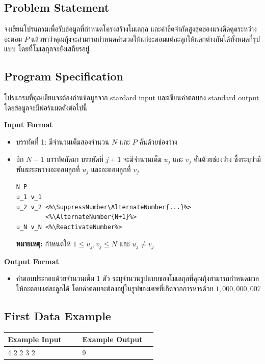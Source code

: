 \subsection*{\sectionfont\upshape Problem Statement}

จงเขียนโปรแกรมเพื่อรับข้อมูลที่กำหนดโครงสร้างโมเลกุล และค่าขีดจำกัดสูงสุดของแรงดึดดูดระหว่างอะตอม $P$ 
แล้วหาว่าคุณกุ้งจะสามารถกำหนดค่ามวลให้แก่อะตอมแต่ละลูกให้แตกต่างกันได้ทั้งหมดกี่รูปแบบ โดยที่โมเลกุลจะยังเสถียรอยู่

\subsection*{\sectionfont\upshape Program Specification}

โปรแกรมที่คุณเขียนจะต้องอ่านข้อมูลจาก stardard input 
และเขียนคำตอบลง standard output โดยข้อมูลจะมีฟอร์แมตดังต่อไปนี้

\bigskip\noindent
{\sectionfont\bfseries Input Format}
\begin{itemize}
\item บรรทัดที่ 1: มีจำนวนเต็มสองจำนวน $N$ และ $P$ คั่นด้วยช่องว่าง
\item อีก $N-1$ บรรทัดถัดมา บรรทัดที่ $j+1$ จะมีจำนวนเต็ม $u_j$ และ $v_j$ 
    คั่นด้วยช่องว่าง ซึ่งระบุว่ามีพันธะระหว่างอะตอมลูกที่ $u_j$ และอะตอมลูกที่ $v_j$  
\begin{lstlisting}
N P
u_1 v_1
u_2 v_2 <%\SuppressNumber\AlternateNumber{...}%>
        <%\AlternateNumber{N+1}%>
u_N v_N <%\ReactivateNumber%>
\end{lstlisting}
\textbf{หมายเหตุ:} กำหนดให้ $1 \leq u_j, v_j \leq N$ และ $u_j \neq v_j$
\end{itemize}

\medskip\noindent
{\sectionfont\bfseries Output Format}
\begin{itemize}
\item คำตอบประกอบด้วยจำนวนเต็ม 1 ตัว 
    ระบุจำนวนรูปแบบของโมเลกุลที่คุณกุ้งสามารถกำหนดมวลให้อะตอมแต่ละลูกได้ 
    โดยคำตอบจะต้องอยู่ในรูปของเศษที่เกิดจากการหารด้วย $1,\!000,\!000,\!007$
\end{itemize}

\subsection*{\sectionfont\upshape First Data Example}
\begin{tabular}{p{0.45\linewidth}p{0.45\linewidth}}
\toprule
Example Input & Example Output \\
\midrule
\ttfamily\setstretch{0.8}
4 2 \newline
1 2 \newline
2 3 \newline
4 2 &
\ttfamily\setstretch{0.8}
9 \\
\bottomrule
\end{tabular}

